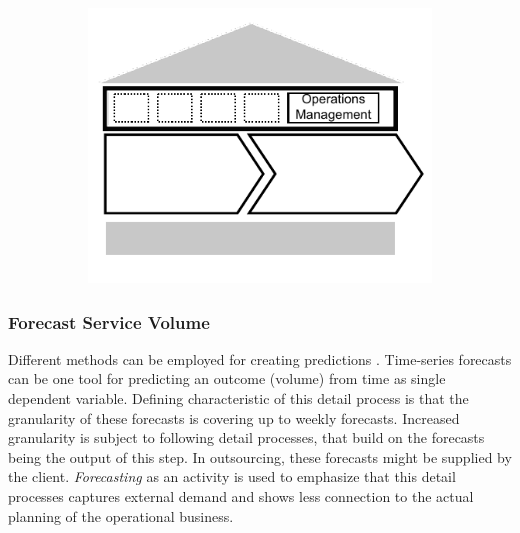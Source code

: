 	\begin{figure}[caption={\textsc{Operations Management} Process}, label={fig:wfm}]
		\begin{subfigure}[c]{.45\textwidth}
			\begin{center}
				\includegraphics{figures/processes/operationsmanagement.pdf}
			\end{center}
		\end{subfigure}
		\begin{subfigure}[c]{.45\textwidth}
			\begin{center}
			\end{center}
		\end{subfigure}
		
	\end{figure}
	
	\subsubsection{Forecast Service Volume}
	Different methods can be employed for creating predictions \citep{9780470525906}. Time-series forecasts can be one tool for predicting an outcome (volume) from time as single dependent variable. Defining characteristic of this detail process is that the granularity of these forecasts is covering up to weekly forecasts. Increased granularity is subject to following detail processes, that build on the forecasts being the output of this step. In outsourcing, these forecasts might be supplied by the client. \textit{Forecasting} as an activity is used to emphasize that this detail processes captures external demand and shows less connection to the actual planning of the operational business.
	
